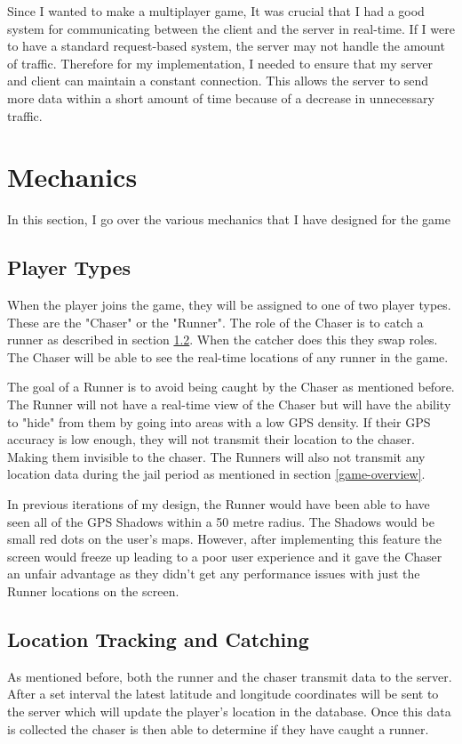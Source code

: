 \documentclass{l4proj}
\begin{document}
Since I wanted to make a multiplayer game, It was crucial that I had a good system for communicating between the client and the server
in real-time. If I were to have a standard request-based system, the server may not handle the amount of traffic. Therefore for my implementation,
I needed to ensure that my server and client can maintain a constant connection. This allows the server to send more data within a short amount of
time because of a decrease in unnecessary traffic.
\section{Mechanics}
In this section, I go over the various mechanics that I have designed for the game

\subsection{Player Types}
\label{playertypes}
When the player joins the game, they will be assigned to one of two player types. These are the "Chaser" or the "Runner".
The role of the Chaser is to catch a runner as described in section \ref{catching}. When the catcher does this they swap roles. The Chaser
will be able to see the real-time locations of any runner in the game.

The goal of a Runner is to avoid being caught by the Chaser as mentioned before. The Runner will not have a real-time
view of the Chaser but will have the ability to "hide" from them by going into areas with a low GPS density. If their
GPS accuracy is low enough, they will not transmit their location to the chaser. Making them invisible to the chaser.
The Runners will also not transmit any location data during the jail period as mentioned in section \ref{game-overview}.

In previous iterations of my design, the Runner would have been able to have seen all of the GPS Shadows within a 50
metre radius. The Shadows would be small red dots on the user's maps. However, after implementing this feature the screen
would freeze up leading to a poor user experience and it gave the Chaser an unfair advantage as they didn't get any
performance issues with just the Runner locations on the screen.

\subsection{Location Tracking and Catching}
\label{catching}
As mentioned before, both the runner and the chaser transmit data to the server. After a set interval
the latest latitude and longitude coordinates will be sent to the server which will update the player's location
in the database. Once this data is collected the chaser is then able to determine if they have caught a runner.
\end{document}
